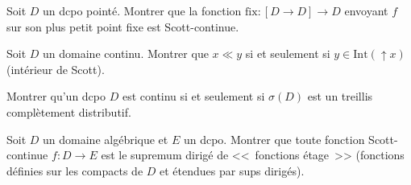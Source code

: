 \begin{exercice}
Soit $D$ un dcpo point\'e. Montrer que la fonction $\mathrm{fix}\colon [D \to D] \to D$
envoyant $f$ sur son plus petit point fixe est Scott-continue.
\end{exercice}

\begin{exercice}
Soit $D$ un domaine continu. Montrer que $x \ll y$ si et seulement si $y \in
\mathrm{Int}(\uparrow\! x)$ (int\'erieur de Scott).
\end{exercice}

\begin{exercice}
Montrer qu'un dcpo $D$ est continu si et seulement si $\sigma(D)$ est un treillis
compl\`etement distributif.
\end{exercice}

\begin{exercice}
Soit $D$ un domaine alg\'ebrique et $E$ un dcpo. Montrer que toute fonction Scott-continue
$f\colon D \to E$ est le supremum dirig\'e de <<~fonctions \'etage~>> (fonctions
d\'efinies sur les compacts de $D$ et \'etendues par sups dirig\'es).
\end{exercice}
